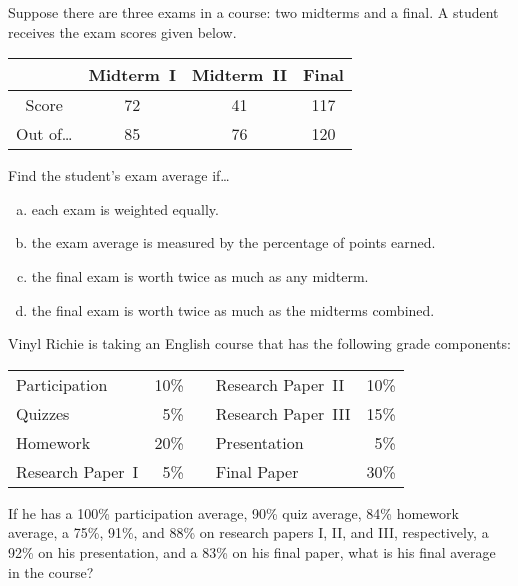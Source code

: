 \documentclass[11pt,letterpaper]{article}
\begin{document}

 Suppose there are three exams in a course: two midterms and a final. A student receives the exam scores given below. \par
	\begin{table}[!ht]
	\centering
	\begin{tabular}{|c|c|c|c|} \hline
	& Midterm~I & Midterm~II & Final \\ \hline
	Score & 72 & 41 & 117 \\ \hline
	Out of\dots & 85 & 76 & 120 \\ \hline
	\end{tabular}
	\end{table} \par
Find the student's exam average if\dots
	\begin{enumerate}[(a)]
	\item each exam is weighted equally.
	\item the exam average is measured by the percentage of points earned.
	\item the final exam is worth twice as much as any midterm.
	\item the final exam is worth twice as much as the midterms combined. 
	\end{enumerate}



\newpage



 Vinyl Richie is taking an English course that has the following grade components: \par
	\begin{table}[!ht]
	\centering
	\begin{tabular}{lrclr}
	Participation & 10\% && Research Paper~II & 10\% \\
	Quizzes & 5\% && Research Paper~III & 15\% \\
	Homework & 20\% && Presentation & 5\% \\
	Research Paper~I & 5\% && Final Paper & 30\%
	\end{tabular}
	\end{table} \par
If he has a 100\% participation average, 90\% quiz average, 84\% homework average, a 75\%, 91\%, and 88\% on research papers I, II, and III, respectively, a 92\% on his presentation, and a 83\% on his final paper, what is his final average in the course?
\end{document}
